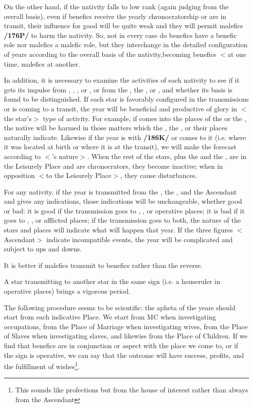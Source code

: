 On the other hand, if the nativity falls to low rank (again judging from the overall basis), even if benefics receive the yearly chronocratorship or are in transit, their influence for good will be quite weak and they will permit malefics \textbf{/176P/} to harm the nativity. \mnbm So, not in every case do benefics have a benefic role nor  malefics a malefic role, but they \mnmb interchange in the detailed configuration of years according to the overall basis of the nativity,becoming benefics $<$at one time, malefics at another.

In addition, it is necessary to examine the activities of each nativity to see if it gets its impulse from \Mercury, \Mars, \Venus, or \Saturn, or from the \Sun, the \Moon, or \Jupiter, and whether its basis is found to be distinguished. If each star is favorably configured in the transmissions or is coming to a transit, the year will be beneficial and productive of glory in $<$the star’s$>$ type of activity. For example, if \Saturn\xspace comes into the places of the \Sun\xspace or the \Moon, the native will be harmed in those matters which the \Sun, the \Moon, or their places naturally indicate. Likewise if the year is with \Saturn\xspace \textbf{/186K/} or comes to it (i.e. where it was located at birth or where it is at the transit), we will make the forecast according to $<$\Saturn’s
nature$>$. When the rest of the stars, plus the \Sun\xspace and the \Moon, are in the Leisurely Place and are chronocrators, they become inactive; when in opposition $<$to the Leisurely Place$>$, they cause disturbances.

For any nativity, if the year is transmitted from the \Sun, the \Moon, and the Ascendant and gives any indications, those indications will be unchangeable, whether good or bad: it is good if the transmission goes to \Venus, \Jupiter, or operative places; it is bad if it goes to \Saturn, \Mars, or afflicted places; if the transmission goes to both, the nature of the stars and places will indicate what will happen that year. If the three figures $<$\Sun\xspace \Moon\xspace Ascendant$>$ indicate incompatible events, the year will be complicated and
subject to ups and downs. 

It is better if malefics transmit to benefics rather than the reverse. 

A star transmitting to another star in the same sign (i.e. a houseruler in operative places) brings a vigorous period.

The following procedure seems to be scientific: the apheta of the years should start from each indicative Place. We start from MC when investigating occupations, from the Place of Marriage when investigating wives, from the Place of Slaves when investigating slaves, and likewise from the Place of Children. If we find that benefics are in conjunction or aspect with the place we come to, or if the sign is operative, we can
say that the outcome will have success, profits, and the fulfillment of wishes\footnote{This sounds like profections but from the house of interest rather than always from the Ascendant}.

